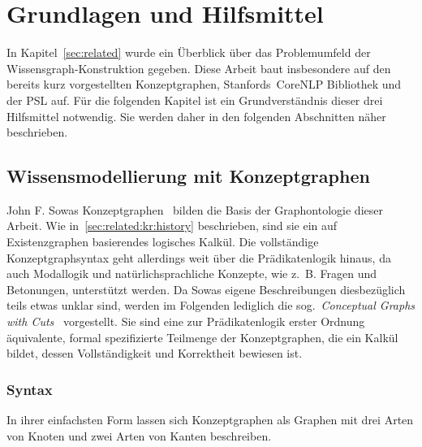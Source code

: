 \def\cgCutScale{0.23}

\chapter{Grundlagen und Hilfsmittel}%
\label{sec:theory}

In Kapitel~\ref{sec:related} wurde ein Überblick über das Problemumfeld der Wissensgraph-Konstruk\-tion gegeben.
Diese Arbeit baut insbesondere auf den bereits kurz vorgestellten Konzeptgraphen, Stanfords~CoreNLP Bibliothek und der PSL auf.
Für die folgenden Kapitel ist ein Grundverständnis dieser drei Hilfsmittel notwendig.
Sie werden daher in den folgenden Abschnitten näher beschrieben.

\section{Wissensmodellierung mit Konzeptgraphen}%
\label{sec:theory:cg}

John F. Sowas Konzeptgraphen~\cite{Harmelen2007} bilden die Basis der Graphontologie dieser Arbeit.
Wie in~\ref{sec:related:kr:history} beschrieben, sind sie ein auf Existenzgraphen basierendes logisches Kalkül.
Die vollständige Konzeptgraphsyntax geht allerdings weit über die Prädikatenlogik hinaus, da auch Modallogik und natürlichsprachliche Konzepte, wie z.~B. Fragen und Betonungen, unterstützt werden.
Da Sowas eigene Beschreibungen diesbezüglich teils etwas unklar sind, werden im Folgenden lediglich die sog.~\textit{Conceptual Graphs with Cuts}~\cite{Dau2003} vorgestellt.
Sie sind eine zur Prädikatenlogik erster Ordnung äquivalente, formal spezifizierte Teilmenge der Konzeptgraphen, die ein Kalkül bildet, dessen Vollständigkeit und Korrektheit bewiesen ist.

\subsection{Syntax}%
\label{sec:theory:cg:syntax}

In ihrer einfachsten Form lassen sich Konzeptgraphen als Graphen mit drei Arten von Knoten und zwei Arten von Kanten beschreiben.

